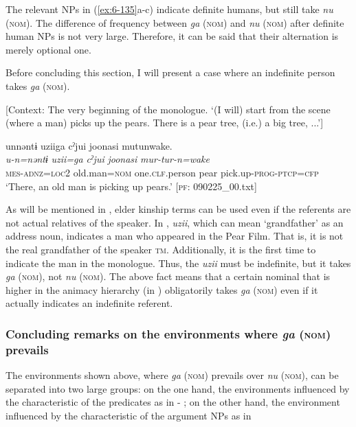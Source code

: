 The relevant NPs in (\ref{ex:6-135}a-c) indicate definite humans, but still take \textit{nu} (\textsc{nom}). The difference of frequency between \textit{ga} (\textsc{nom}) and \textit{nu} (\textsc{nom}) after definite human NPs is not very large. Therefore, it can be said that their alternation is merely optional one.

  Before concluding this section, I will present a case where an indefinite person takes \textit{ga} (\textsc{nom}).

\ea\label{ex:6-136}
  [Context: The very beginning of the monologue. {\TM} ‘(I will) start from the scene (where a man) picks up the pears. There is a pear tree, (i.e.) a big tree, ...’]

{\TM}
\glll unnəntɨ  uziiga  cˀjui  joonasi    mutunwake.\\
\textit{u-n=nəntɨ}  \textit{uzii=ga}  \textit{cˀjui}  \textit{joonasi} \textit{mur-tur-n=wake}\\
    \textsc{mes}-\textsc{adnz}=\textsc{loc2}  old.man=\textsc{nom}  one.\textsc{clf}.person  pear   pick.up-\textsc{prog}-\textsc{ptcp}=\textsc{cfp}\\
\glt    ‘There, an old man is picking up pears.’ [\textsc{pf}: 090225\_00.txt]
\z

As will be mentioned in , elder kinship terms can be used even if the referents are not actual relatives of the speaker. In , \textit{uzii}, which can mean ‘grandfather’ as an address noun, indicates a man who appeared in the Pear Film. That is, it is not the real grandfather of the speaker \textsc{tm}. Additionally, it is the first time to indicate the man in the monologue. Thus, the \textit{uzii} must be indefinite, but it takes \textit{ga} (\textsc{nom}), not \textit{nu} (\textsc{nom}). The above fact means that a certain nominal that is higher in the animacy hierarchy (in ) obligatorily takes \textit{ga} (\textsc{nom}) even if it actually indicates an indefinite referent.

\subsubsection{Concluding remarks on the environments where \textit{ga} (\textsc{nom}) prevails}

The environments shown above, where \textit{ga} (\textsc{nom}) prevails over \textit{nu} (\textsc{nom}), can be separated into two large groups: on the one hand, the environments influenced by the characteristic of the predicates as in  - ; on the other hand, the environment influenced by the characteristic of the argument NPs as in 

